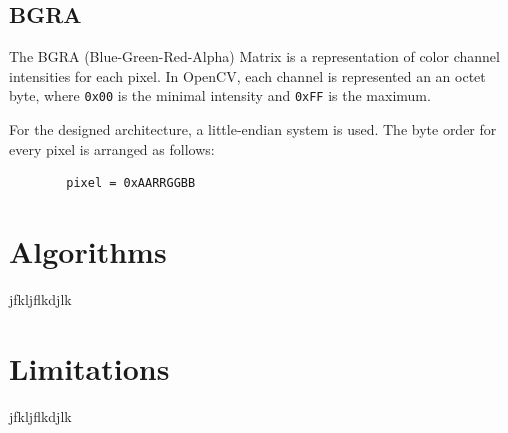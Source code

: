 \documentclass[
10pt, %
letterpaper, %
oneside, %
headinclude,footinclude, %
BCOR5mm, %
]{scrartcl}
\begin{document}
\subsection{BGRA}
The BGRA (Blue-Green-Red-Alpha) Matrix is a representation of color channel intensities for each pixel. In OpenCV, each channel is represented
an an octet byte, where \verb|0x00| is the minimal intensity and \verb|0xFF| is the maximum.

For the designed architecture, a little-endian system is used. The byte order for every pixel is arranged as follows:
\begin{center}
    \begin{verbatim}
        pixel = 0xAARRGGBB
    \end{verbatim}
\end{center}

\pagebreak
\section{Algorithms} %
jfkljflkdjlk


\pagebreak
\section{Limitations} %
jfkljflkdjlk
\end{document}
